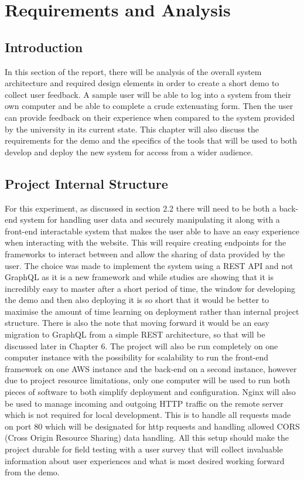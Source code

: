 \chapter{Requirements and Analysis}

\section{Introduction}

In this section of the report, there will be analysis of the overall system architecture and required design elements in order to create a short demo to collect user feedback. A sample user will be able to log into a system from their own computer and be able to complete a crude extenuating form. Then the user can provide feedback on their experience when compared to the system provided by the university in its current state. This chapter will also discuss the requirements for the demo and the specifics of the tools that will be used to both develop and deploy the new system for access from a wider audience.

\section{Project Internal Structure}

For this experiment, as discussed in section 2.2 there will need to be both a back-end system for handling user data and securely manipulating it along with a front-end interactable system that makes the user able to have an easy experience when interacting with the website. This will require creating endpoints for the frameworks to interact between and allow the sharing of data provided by the user. The choice was made to implement the system using a REST API and not GraphQL as it is a new framework and while studies are showing that it is incredibly easy to master after a short period of time, the window for developing the demo and then also deploying it is so short that it would be better to maximise the amount of time learning on deployment rather than internal project structure. There is also the note that moving forward it would be an easy migration to GraphQL from a simple REST architecture, so that will be discussed later in Chapter 6.
\newline
\newline
The project will also be run completely on one computer instance with the possibility for scalability to run the front-end framework on one AWS instance and the back-end on a second instance, however due to project resource limitations, only one computer will be used to run both pieces of software to both simplify deployment and configuration. Nginx will also be used to manage incoming and outgoing HTTP traffic on the remote server which is not required for local development. This is to handle all requests made on port 80 which will be designated for http requests and handling allowed CORS (Cross Origin Resource Sharing) data handling. All this setup should make the project durable for field testing with a user survey that will collect invaluable information about user experiences and what is most desired working forward from the demo.

